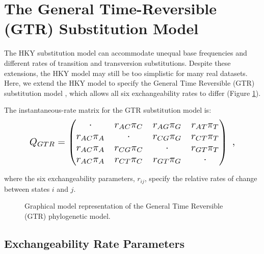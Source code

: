 \newpage
\section{The General Time-Reversible (GTR) Substitution Model}

The HKY substitution model can accommodate unequal base frequencies and different rates of transition and transversion substitutions.
Despite these extensions, the HKY model may still be too simplistic for many real datasets.
Here, we extend the HKY model to specify the General Time Reversible (GTR) substitution model \citep{Tavare1986}, which allows all six exchangeability rates to differ (Figure \ref{fig:gtr}).

The instantaneous-rate matrix for the GTR substitution model is:
\begin{equation*}
\resizebox{4in}{!}{%
$Q_{GTR} = \begin{pmatrix}
{\cdot}	   & {r_{AC}\pi_C} & {r_{AG}\pi_G} & {r_{AT}\pi_T} \\
{r_{AC}\pi_A} & {\cdot}       & {r_{CG}\pi_G} & {r_{CT}\pi_T} \\
{r_{AC}\pi_A} & {r_{CG}\pi_C} & {\cdot}       & {r_{GT}\pi_T} \\
{r_{AC}\pi_A} & {r_{CT}\pi_C} & {r_{GT}\pi_G} & {\cdot}       \\
\end{pmatrix} \mbox{  ,} $}
\end{equation*}

where the six exchangeability parameters, $r_{ij}$, specify the relative rates of change between states $i$ and $j$.  


\begin{figure}[h!]
\centering
{}
\caption{\small Graphical model representation of the General Time Reversible (GTR) phylogenetic model.}
\label{fig:gtr}
\end{figure}


\subsection{Exchangeability Rate Parameters}

